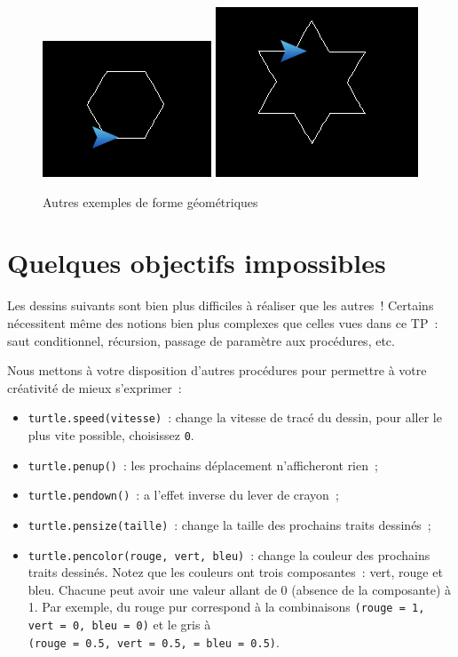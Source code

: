 \documentclass[11pt,a4paper]{article}
\begin{document}
\begin{figure}[H]
    \centering
    \includegraphics[height=0.4\textwidth]{img/approx_circle_hexagon}
    \includegraphics[height=0.4\textwidth]{img/star}
    \caption{Autres exemples de forme géométriques}
    \label{fig:ending_examples}
\end{figure}

\section{Quelques objectifs impossibles}

Les dessins suivants sont bien plus difficiles à réaliser que les autres~!
Certains nécessitent même des notions bien plus complexes que celles vues dans
ce TP~: saut conditionnel, récursion, passage de paramètre aux procédures, etc.

Nous mettons à votre disposition d'autres procédures pour permettre à
votre créativité de mieux s'exprimer~:

\begin{itemize}
    \item \lstinline{turtle.speed(vitesse)}~: change la vitesse de tracé du dessin, pour
        aller le plus vite possible, choisissez \lstinline{0}.
    \item \lstinline{turtle.penup()}~: les prochains déplacement n'afficheront rien~;
    \item \lstinline{turtle.pendown()}~: a l'effet inverse du lever de crayon~;
    \item \lstinline{turtle.pensize(taille)}~: change la taille des prochains traits
        dessinés~;
    \item \lstinline{turtle.pencolor(rouge, vert, bleu)}~: change la couleur des
        prochains traits dessinés. Notez que les couleurs ont trois
        composantes~: vert, rouge et bleu. Chacune peut avoir une valeur allant
        de 0 (absence de la composante) à 1. Par exemple, du rouge pur
        correspond à la combinaisons \lstinline{(rouge = 1, vert = 0, bleu = 0)}
        et le gris à \\ \lstinline{(rouge = 0.5, vert = 0.5, = bleu = 0.5)}.
\end{itemize}
\end{document}
